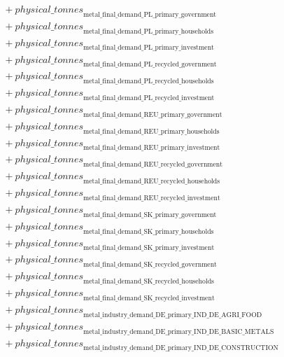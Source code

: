 \documentclass[11pt]{article}
\begin{document}
\begin{align*}
&\quad {}+ {physical\_tonnes}_{\text{metal\_final\_demand\_PL\_primary\_government}}\\
&\quad {}+ {physical\_tonnes}_{\text{metal\_final\_demand\_PL\_primary\_households}}\\
&\quad {}+ {physical\_tonnes}_{\text{metal\_final\_demand\_PL\_primary\_investment}}\\
&\quad {}+ {physical\_tonnes}_{\text{metal\_final\_demand\_PL\_recycled\_government}}\\
&\quad {}+ {physical\_tonnes}_{\text{metal\_final\_demand\_PL\_recycled\_households}}\\
&\quad {}+ {physical\_tonnes}_{\text{metal\_final\_demand\_PL\_recycled\_investment}}\\
&\quad {}+ {physical\_tonnes}_{\text{metal\_final\_demand\_REU\_primary\_government}}\\
&\quad {}+ {physical\_tonnes}_{\text{metal\_final\_demand\_REU\_primary\_households}}\\
&\quad {}+ {physical\_tonnes}_{\text{metal\_final\_demand\_REU\_primary\_investment}}\\
&\quad {}+ {physical\_tonnes}_{\text{metal\_final\_demand\_REU\_recycled\_government}}\\
&\quad {}+ {physical\_tonnes}_{\text{metal\_final\_demand\_REU\_recycled\_households}}\\
&\quad {}+ {physical\_tonnes}_{\text{metal\_final\_demand\_REU\_recycled\_investment}}\\
&\quad {}+ {physical\_tonnes}_{\text{metal\_final\_demand\_SK\_primary\_government}}\\
&\quad {}+ {physical\_tonnes}_{\text{metal\_final\_demand\_SK\_primary\_households}}\\
&\quad {}+ {physical\_tonnes}_{\text{metal\_final\_demand\_SK\_primary\_investment}}\\
&\quad {}+ {physical\_tonnes}_{\text{metal\_final\_demand\_SK\_recycled\_government}}\\
&\quad {}+ {physical\_tonnes}_{\text{metal\_final\_demand\_SK\_recycled\_households}}\\
&\quad {}+ {physical\_tonnes}_{\text{metal\_final\_demand\_SK\_recycled\_investment}}\\
&\quad {}+ {physical\_tonnes}_{\text{metal\_industry\_demand\_DE\_primary\_IND\_DE\_AGRI\_FOOD}}\\
&\quad {}+ {physical\_tonnes}_{\text{metal\_industry\_demand\_DE\_primary\_IND\_DE\_BASIC\_METALS}}\\
&\quad {}+ {physical\_tonnes}_{\text{metal\_industry\_demand\_DE\_primary\_IND\_DE\_CONSTRUCTION}}\\

\end{align*}
\end{document}
